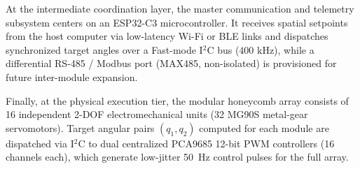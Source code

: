\documentclass[lettersize,journal]{IEEEtran}
\begin{document}
	At the intermediate coordination layer, the master communication and telemetry subsystem centers on an ESP32-C3 microcontroller. It receives spatial setpoints from the host computer via low-latency Wi-Fi or BLE links and dispatches synchronized target angles over a Fast-mode I$^2$C bus ($400\text{ kHz}$), while a differential RS-485 / Modbus port (MAX485, non-isolated) is provisioned for future inter-module expansion.
	
	Finally, at the physical execution tier, the modular honeycomb array consists of 16 independent 2-DOF electromechanical units (32 MG90S metal-gear servomotors). Target angular pairs $(q_1, q_2)$ computed for each module are dispatched via I$^2$C to dual centralized PCA9685 12-bit PWM controllers (16 channels each), which generate low-jitter 50~Hz control pulses for the full array.
	
\end{document}
